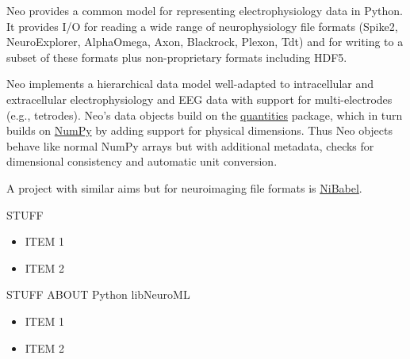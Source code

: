 \begin{multicols}{3}
Neo provides a common model for representing
electrophysiology data in Python. It provides I/O for reading a wide
range of neurophysiology file formats (Spike2,
NeuroExplorer, AlphaOmega, Axon, Blackrock, Plexon, Tdt) and for
writing to a subset of these formats plus non-proprietary formats
including HDF5.


Neo implements a hierarchical data model well-adapted to intracellular
and extracellular electrophysiology and EEG data with support for
multi-electrodes (e.g., tetrodes).  Neo's data objects build on
the \href{http://pypi.python.org/pypi/quantities}{quantities} package,
which in turn builds on \href{http://www.numpy.org}{NumPy} by adding
support for physical dimensions. Thus Neo objects behave like
normal NumPy arrays but with additional metadata, checks for
dimensional consistency and automatic unit conversion.

A project with similar aims but for neuroimaging file formats is
\href{http://www.nipy.org/nibabel}{NiBabel}.


STUFF

\begin{itemize}[nolistsep,topsep=0em,leftmargin=1pc]
\item ITEM 1
\item ITEM 2
\end{itemize}

%


STUFF ABOUT Python libNeuroML

\begin{itemize}[nolistsep,topsep=0em,leftmargin=1pc]
\item ITEM 1
\item ITEM 2
\end{itemize}


\end{multicols}
